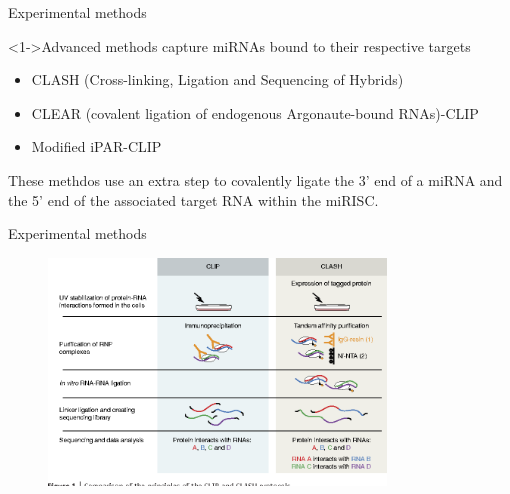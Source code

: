 \documentclass{beamer}
\begin{document}
\begin{frame}{Experimental methods}
\begin{exampleblock}
		<1->{Advanced methods}
		  capture miRNAs bound to their respective targets
	\begin{itemize}
\item CLASH (Cross-linking, Ligation and Sequencing of Hybrids)
\item CLEAR (covalent ligation of endogenous Argonaute-bound RNAs)-CLIP 
\item Modified iPAR-CLIP 
\end{itemize}
\end{exampleblock}
These methdos use an extra step to covalently ligate the 3' end of a miRNA and the 5' end of the associated target RNA within the miRISC. 
\end{frame}

\begin{frame}{Experimental methods}
\begin{figure}[hb!]
	  \centering
    \includegraphics[width=0.8\textwidth]{images/clash11.png}
\end{figure}
\end{frame}
\end{document}
